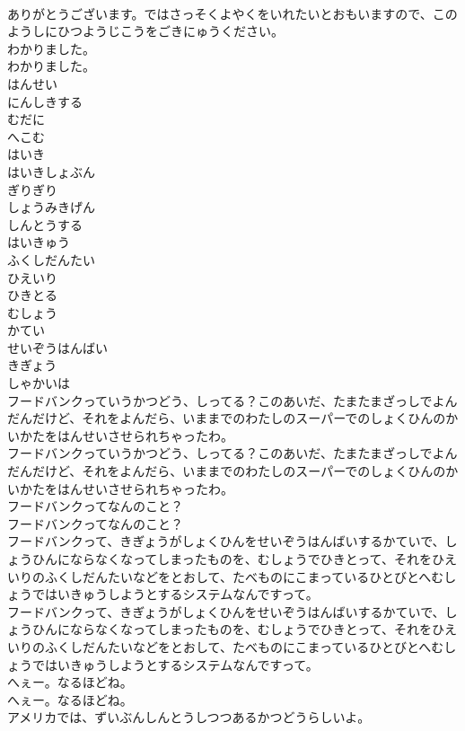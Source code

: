 \documentclass[8pt]{extreport}
\begin{document}
\begin{CJK}{UTF8}{min}
\\	ありがとうございます。ではさっそくよやくをいれたいとおもいますので、このようしにひつようじこうをごきにゅうください。
\\	わかりました。
\\	わかりました。
\\	はんせい
\\	にんしきする
\\	むだに
\\	へこむ
\\	はいき
\\	はいきしょぶん
\\	ぎりぎり
\\	しょうみきげん
\\	しんとうする
\\	はいきゅう
\\	ふくしだんたい
\\	ひえいり
\\	ひきとる
\\	むしょう
\\	かてい
\\	せいぞうはんばい
\\	きぎょう
\\	しゃかいは
\\	フードバンクっていうかつどう、しってる？このあいだ、たまたまざっしでよんだんだけど、それをよんだら、いままでのわたしのスーパーでのしょくひんのかいかたをはんせいさせられちゃったわ。
\\	フードバンクっていうかつどう、しってる？このあいだ、たまたまざっしでよんだんだけど、それをよんだら、いままでのわたしのスーパーでのしょくひんのかいかたをはんせいさせられちゃったわ。
\\	フードバンクってなんのこと？
\\	フードバンクってなんのこと？
\\	フードバンクって、きぎょうがしょくひんをせいぞうはんばいするかていで、しょうひんにならなくなってしまったものを、むしょうでひきとって、それをひえいりのふくしだんたいなどをとおして、たべものにこまっているひとびとへむしょうではいきゅうしようとするシステムなんですって。
\\	フードバンクって、きぎょうがしょくひんをせいぞうはんばいするかていで、しょうひんにならなくなってしまったものを、むしょうでひきとって、それをひえいりのふくしだんたいなどをとおして、たべものにこまっているひとびとへむしょうではいきゅうしようとするシステムなんですって。
\\	へぇー。なるほどね。
\\	へぇー。なるほどね。
\\	アメリカでは、ずいぶんしんとうしつつあるかつどうらしいよ。

\end{CJK}
\end{document}
